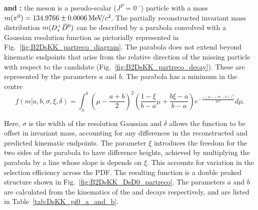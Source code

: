 \begin{description}
\item \textbf{\decay{\Bp}{(\decay{\Dssp}{\Dsp[\piz]})\Dzb} and \decay{\Bp}{\Dsp(\decay{\Dstarzb}{\Dzb[\piz]})}:} the \piz meson is a pseudo-scalar ($J^{P} = 0^{-}$) particle with a mass $m({{\pi}^0}) = 134.9766 \pm 0.0006 {\mathrm{\,Me\kern -0.1em V\!/}c^2}$. The partially reconstructed invariant mass distribution $m({{D}^+_{s}}{{\kern 0.2em\overline{\kern -0.2em D}{}}{}^0})$ can be described by a parabola convolved with a Gaussian resolution function as pictorially represented in Fig.~\ref{fig:B2DsKK_partreco_diagram}. The parabola does not extend beyond kinematic endpoints that arise from the relative direction of the missing particle with respect to the \Dsp\Dzb candidate (Fig.~\ref{fig:B2DsKK_partreco_decay}). These are represented by the parameters $a$ and $b$. The parabola has a minimum in the centre 
\begin{equation}
f(m|a,b,\sigma,\xi, \delta) = \int_{a}^{b}\left(\mu-\frac{a+b}{2}\right)^{2} \left( \frac{1-\xi}{b-a}\mu + \frac{b\xi-a}{b-a} \right) e^{-\frac{-(\mu-(m-\delta))^{2}}{2\sigma^{2}}} d\mu.
\end{equation} 

Here, $\sigma$ is the width of the resolution Gaussian and $\delta$ allows the function to be offset in invariant mass, accounting for any differences in the reconstructed and predicted kinematic endpoints. The parameter $\xi$ introduces the freedom for the two sides of the parabola to have difference heights, achieved by multiplying the parabola by a line whose slope is depends on $\xi$. This accounts for variation in the selection efficiency across the PDF. The resulting function is a double peaked structure shown in Fig.~\ref{fig:B2DsKK_DsD0_partreco}.   
The parameters $a$ and $b$ are calculated from the kinematics of the \decay{\Bp}{(\decay{\Dssp}{\Dsp\piz})\Dzb} and \decay{\Bp}{\Dsp(\decay{\Dstarzb}{\Dzb\piz})} decays respectively, and are listed in Table~\ref{tab:DsKK_pi0_a_and_b}.

\end{description}

